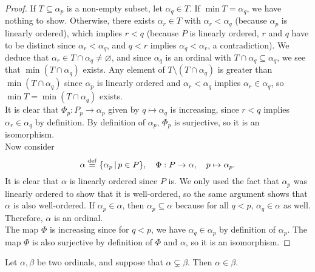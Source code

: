 \begin{proof}
    If $T \subseteq \alpha_p$ is a non-empty subset, let $\alpha_q \in T$. If $\min T = \alpha_q$, we have nothing to show. Otherwise, there exists $\alpha_r \in T$ with $\alpha_r < \alpha_q$ (because $\alpha_p$ is linearly ordered), which implies $r < q$ (because $P$ is linearly ordered, $r$ and $q$ have to be distinct since $\alpha_r < \alpha_q$, and $q < r$ implies $\alpha_q < \alpha_r$, a contradiction). We deduce that $\alpha_r \in T \cap \alpha_q \neq \varnothing$, and since $\alpha_q$ is an ordinal with $T \cap \alpha_q \subseteq \alpha_q$, we see that $\min(T \cap \alpha_q)$ exists. Any element of $T \setminus (T \cap \alpha_q)$ is greater than $\min(T \cap \alpha_q)$ since $\alpha_p$ is linearly ordered and $\alpha_r < \alpha_q$ implies $\alpha_r \in \alpha_q$, so $\min T = \min(T \cap \alpha_q)$ exists.
    \\

    It is clear that $\Phi_p : P_p \to \alpha_p$ given by $q \mapsto \alpha_q$ is increasing, since $r < q$ implies $\alpha_r \in \alpha_q$ by definition. By definition of $\alpha_p$, $\Phi_p$ is surjective, so it is an isomorphism. 
    \\

    Now consider 
    \[
        \alpha \overset{\mathrm{def}}{=} \{ \alpha_p \, | \, p \in P \}, \quad \Phi : P \to \alpha, \quad p \mapsto \alpha_p.     
    \]
    It is clear that $\alpha$ is linearly ordered since $P$ is. We only used the fact that $\alpha_p$ was linearly ordered to show that it is well-ordered, so the same argument shows that $\alpha$ is also well-ordered. If $\alpha_p \in \alpha$, then $\alpha_p \subseteq \alpha$ because for all $q < p$, $\alpha_q \in \alpha$ as well. Therefore, $\alpha$ is an ordinal. 
    \\

    The map $\Phi$ is increasing since for $q < p$, we have $\alpha_q \in \alpha_p$ by definition of $\alpha_p$. The map $\Phi$ is also surjective by definition of $\Phi$ and $\alpha$, so it is an isomorphism. 
\end{proof}

\begin{lemma} \label{proper-subsets-of-ordinals-are-its-elements}
    Let $\alpha,\beta$ be two ordinals, and suppose that $\alpha \subsetneq \beta$. Then $\alpha \in \beta$. 
\end{lemma}

